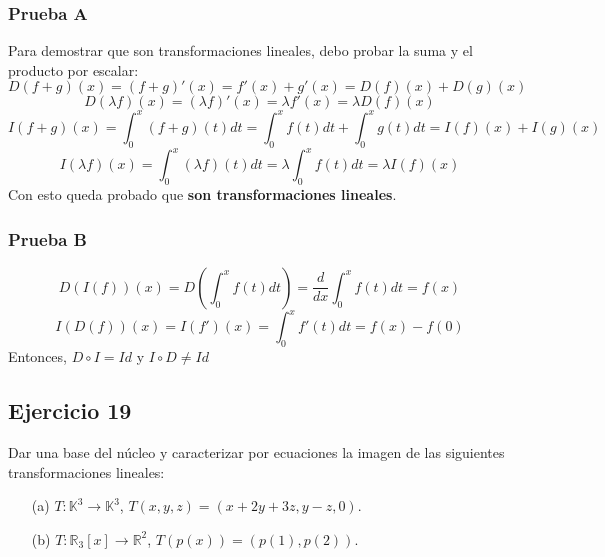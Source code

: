 \documentclass[a4paper,12pt]{article}
\begin{document}
\subsubsection{Prueba A}
Para demostrar que son transformaciones lineales, debo probar la suma y el producto por escalar:
$$
D(f+g)(x)=(f+g)'(x)=f'(x)+g'(x)=D(f)(x)+D(g)(x)
$$
$$
D(\lambda f)(x)=(\lambda f)'(x)=\lambda f'(x)=\lambda D(f)(x)
$$
$$
I(f+g)(x)=\int_0^x (f+g)(t)dt=\int_0^x f(t)dt+\int_0^x g(t)dt=I(f)(x)+I(g)(x)
$$
$$
I(\lambda f)(x)=\int_0^x (\lambda f)(t)dt=\lambda \int_0^x f(t)dt=\lambda I(f)(x)
$$
Con esto queda probado que \textbf{son transformaciones lineales}.
\subsubsection{Prueba B}
$$
D(I(f))(x)=D(\int_0^x f(t)dt)=\frac{d}{dx} \int_0^x f(t)dt=f(x)
$$
$$
I(D(f))(x)=I(f')(x)=\int_0^x f'(t)dt=f(x)-f(0)
$$
Entonces, $D\circ I = Id$ y $I \circ D \neq Id$ \\
\subsection{Ejercicio 19}
Dar una base del núcleo y caracterizar por ecuaciones la imagen de las siguientes transformaciones lineales:
\begin{itemize}
    \item[(a)] $T:\mathds{K}^3\to\mathds{K}^3$, $T(x,y,z)=(x+2y+3z,y-z,0)$. 
    \item[(b)] $T:\mathds{R}_3[x]\to \mathds{R}^2$, $T(p(x))= (p(1), p(2))$.
\end{itemize}
\end{document}
